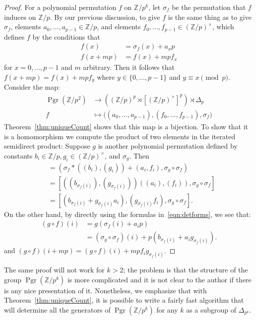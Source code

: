 \documentclass[oneside]{amsart}
\theoremstyle{nthm}
\theoremstyle{ndef}
\theoremstyle{nrem}
\newcommand{\Z}{\mathbb{Z}}
\DeclareMathOperator{\Pgr}{Pgr}
\begin{document}
\begin{proof}
    For a polynomial permutation $f$ on $\Z/p^k$, let $\sigma_f$ be the permutation that $f$ induces on $\Z/p$. By our previous discussion, to give $f$ is the same thing as to give $\sigma_f$, elements $a_0,\dots,a_{p-1}\in \Z/p$, and elements $f_0,\dots,f_{p-1}\in(\Z/p)^\times$, which defines $f$ by the conditions that
    \begin{equation}\label{eqn:detforms}
        \begin{split}
        f(x) &= \sigma_f(x) + a_xp \\
        f(x + mp) &= f(x) + mpf_x
    \end{split}
    \end{equation}
    for $x = 0,\dots,p-1$ and $m$ arbitrary. Then it follows that $f(x + mp) = f(x) + mpf_y$ where $y\in \{ 0,\dots,p-1\}$ and $y\equiv x\pmod{p}$. Consider the map:
    \begin{align*}
        \Pgr(\Z/p^2)&\longrightarrow( (\Z/p)^p\rtimes [(\Z/p)^\times]^p)\rtimes \Delta_p\\
        f&\longmapsto \bigl( (a_0,\dots,a_{p-1}), (f_0,\dots,f_{p-1}), \sigma_f \bigr)
    \end{align*}
    Theorem~\ref{thm:uniqueCount} shows that this map is a bijection. To show that it is a homomorphism we compute the product of two elements in the iterated semidirect product: Suppose $g$ is another polynomial permutation defined by constants $b_i\in \Z/p, g_i\in (\Z/p)^\times$, and $\sigma_g$. Then
    \begin{align*}
        [ (a_i), (f_i), \sigma_f ][ (b_i), (g_i), \sigma_g ] &= ( \sigma_f*( (b_i), (g_i) ) + (a_i, f_i), \sigma_g\circ\sigma_f )\\
        &= [ ( (b_{\sigma_f(i)}), (g_{\sigma_f(i)}))( (a_i), (f_i) ), \sigma_g\circ\sigma_f]\\
        &= [ ( b_{\sigma_f(i)} + g_{\sigma_f(i)}a_i), (g_{\sigma_f(i)}f_i), \sigma_g\circ\sigma_f ].
    \end{align*}
    On the other hand, by directly using the formulas in~\eqref{eqn:detforms}, we see that:
\begin{align*}
    (g\circ f)(i) &= g(\sigma_f(i) + a_ip)\\
    &= (\sigma_g\circ\sigma_f)(i) + p(b_{\sigma_f(i)} + a_ig_{\sigma_f(i)}).
\end{align*}
and $(g\circ f)(i + mp) = (g\circ f)(i) + mpf_ig_{\sigma_f(i)}$.
\end{proof}
The same proof will not work for $k > 2$; the problem is that the structure of the group $\Pgr(\Z/p^k)$ is more complicated and it is not clear to the author if there is any nice presentation of it. Nonetheless, we emphasize that with Theorem~\ref{thm:uniqueCount}, it is possible to write a fairly fast algorithm that will determine all the generators of $\Pgr(\Z/p^k)$ for any $k$ as a subgroup of $\Delta_{p^k}$. 
\end{document}
